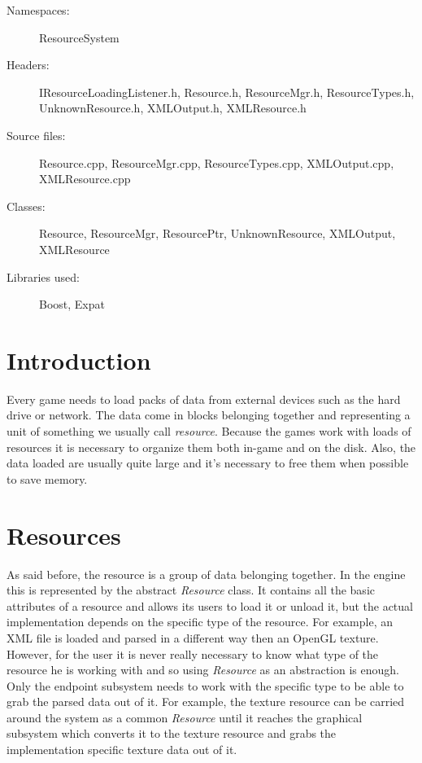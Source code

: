 \begin{description}
  \item[Namespaces:] ResourceSystem
  \item[Headers:] IResourceLoadingListener.h, Resource.h, ResourceMgr.h, Re\-sour\-ce\-Ty\-pes.h, UnknownResource.h, XMLOutput.h, XMLResource.h
  \item[Source files:] Resource.cpp, ResourceMgr.cpp, ResourceTypes.cpp, XML\-Out\-put.cpp, XMLResource.cpp
  \item[Classes:] Resource, ResourceMgr, ResourcePtr, UnknownResource, XML\-Out\-put, XMLResource
  \item[Libraries used:] Boost, Expat
\end{description}

\section{Introduction}

Every game needs to load packs of data from external devices such as the hard drive or network. The data come in blocks belonging together and representing a unit of something we usually call \emph{resource}. Because the games work with loads of resources it is necessary to organize them both in-game and on the disk. Also, the data loaded are usually quite large and it's necessary to free them when possible to save memory.


\section{Resources}
As said before, the resource is a group of data belonging together. In the engine this is represented by the abstract \emph{Resource} class. It contains all the basic attributes of a resource and allows its users to load it or unload it, but the actual implementation depends on the specific type of the resource. For example, an XML file is loaded and parsed in a different way then an OpenGL texture. However, for the user it is never really necessary to know what type of the resource he is working with and so using \emph{Resource} as an abstraction is enough. Only the endpoint subsystem needs to work with the specific type to be able to grab the parsed data out of it. For example, the texture resource can be carried around the system as a common \emph{Resource} until it reaches the graphical subsystem which converts it to the texture resource and grabs the implementation specific texture data out of it.

